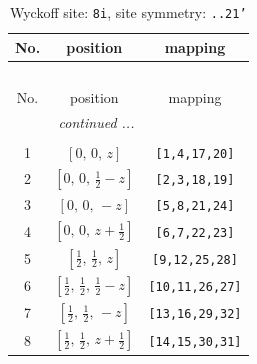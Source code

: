 \documentclass[fleqn,8pt]{jsarticle}
\begin{document}
\begin{longtable}{ccc}
\caption{Wyckoff site: {\tt 8i}, site symmetry: {\tt ..21'}}
 \\
 \hline \hline
No. & position & mapping \\ \hline \endfirsthead

\multicolumn{2}{l}{\tablename\ \thetable{}} \\
 \hline \hline
No. & position & mapping \\ \hline \endhead

 \hline \hline
\multicolumn{2}{r}{\footnotesize\it continued ...} \\ \endfoot

 \hline \hline
\multicolumn{2}{r}{} \\ \endlastfoot

1 & $\left[ 0,\, 0,\, z \right]$ & {\tt [1,4,17,20]} \\ \hline
2 & $\left[ 0,\, 0,\, \frac{1}{2} - z \right]$ & {\tt [2,3,18,19]} \\ \hline
3 & $\left[ 0,\, 0,\, - z \right]$ & {\tt [5,8,21,24]} \\ \hline
4 & $\left[ 0,\, 0,\, z + \frac{1}{2} \right]$ & {\tt [6,7,22,23]} \\ \hline
5 & $\left[ \frac{1}{2},\, \frac{1}{2},\, z \right]$ & {\tt [9,12,25,28]} \\ \hline
6 & $\left[ \frac{1}{2},\, \frac{1}{2},\, \frac{1}{2} - z \right]$ & {\tt [10,11,26,27]} \\ \hline
7 & $\left[ \frac{1}{2},\, \frac{1}{2},\, - z \right]$ & {\tt [13,16,29,32]} \\ \hline
8 & $\left[ \frac{1}{2},\, \frac{1}{2},\, z + \frac{1}{2} \right]$ & {\tt [14,15,30,31]} \\
\end{longtable}
\renewcommand{\arraystretch}{1.2}
\end{document}

